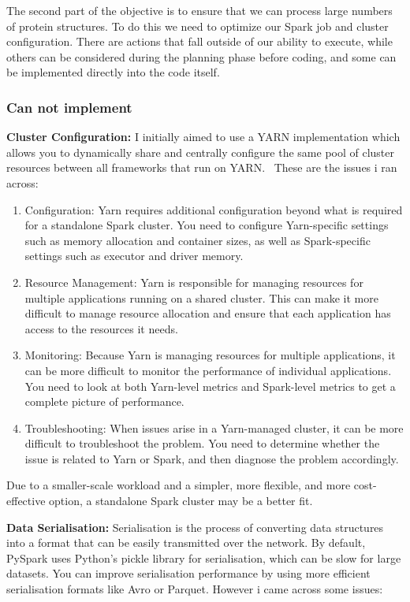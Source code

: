 \documentclass[]{final_report}
\begin{document}
The second part of the objective is to ensure that we can process large numbers of protein structures. To do this we need to optimize our Spark job and cluster configuration. There are actions that fall outside of our ability to execute, while others can be considered during the planning phase before coding, and some can be implemented directly into the code itself.

\subsubsection{Can not implement}
\textbf{Cluster Configuration:} I initially aimed to use a YARN implementation which allows you to dynamically share and centrally configure the same pool of cluster resources between all frameworks that run on YARN.~\cite{goyal_spark_2018} These are the issues i ran across:

\begin{enumerate}
    \item Configuration: Yarn requires additional configuration beyond what is required for a standalone Spark cluster. You need to configure Yarn-specific settings such as memory allocation and container sizes, as well as Spark-specific settings such as executor and driver memory.
    \item Resource Management: Yarn is responsible for managing resources for multiple applications running on a shared cluster. This can make it more difficult to manage resource allocation and ensure that each application has access to the resources it needs.
    \item Monitoring: Because Yarn is managing resources for multiple applications, it can be more difficult to monitor the performance of individual applications. You need to look at both Yarn-level metrics and Spark-level metrics to get a complete picture of performance.
    \item Troubleshooting: When issues arise in a Yarn-managed cluster, it can be more difficult to troubleshoot the problem. You need to determine whether the issue is related to Yarn or Spark, and then diagnose the problem accordingly.
\end{enumerate}

Due to a smaller-scale workload and a simpler, more flexible, and more cost-effective option, a standalone Spark cluster may be a better fit.

\textbf{Data Serialisation:} Serialisation is the process of converting data structures into a format that can be easily transmitted over the network. By default, PySpark uses Python's pickle library for serialisation, which can be slow for large datasets. You can improve serialisation performance by using more efficient serialisation formats like Avro or Parquet. However i came across some issues:
\end{document}
